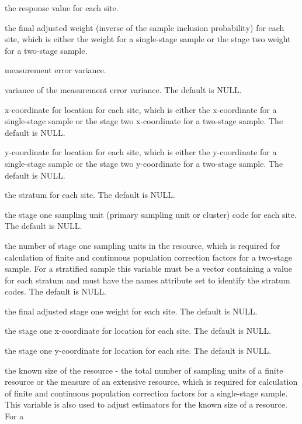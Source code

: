 \begin{Arguments}
\begin{ldescription}
\item[\code{z}] the response value for each site.
\item[\code{wgt}] the final adjusted weight (inverse of the sample inclusion
probability) for each site, which is either the weight for a 
single-stage sample or the stage two weight for a two-stage sample.
\item[\code{sigma}] measurement error variance.
\item[\code{var.sigma}] variance of the measurement error variance.  The default is
NULL.
\item[\code{x}] x-coordinate for location for each site, which is either the
x-coordinate for a single-stage sample or the stage two 
x-coordinate for a two-stage sample.  The default is NULL.
\item[\code{y}] y-coordinate for location for each site, which is either the
y-coordinate for a single-stage sample or the stage two 
y-coordinate for a two-stage sample.  The default is NULL.
\item[\code{stratum}] the stratum for each site.  The default is NULL.
\item[\code{cluster}] the stage one sampling unit (primary sampling unit or cluster) 
code for each site.  The default is NULL.
\item[\code{N.cluster}] the number of stage one sampling units in the resource, which 
is required for calculation of finite and continuous population 
correction factors for a two-stage sample.  For a stratified sample 
this variable must be a vector containing a value for each stratum and
must have the names attribute set to identify the stratum codes.  The
default is NULL.
\item[\code{wgt1}] the final adjusted stage one weight for each site.  The default
is NULL.
\item[\code{x1}] the stage one x-coordinate for location for each site.  The default
is NULL.
\item[\code{y1}] the stage one y-coordinate for location for each site.  The default
is NULL.
\item[\code{popsize}] the known size of the resource - the total number of sampling 
units of a finite resource or the measure of an extensive resource,
which is required for calculation of finite and continuous population 
correction factors for a single-stage sample.  This variable is also 
used to adjust estimators for the known size of a resource.  For a

\end{ldescription}
\end{Arguments}

